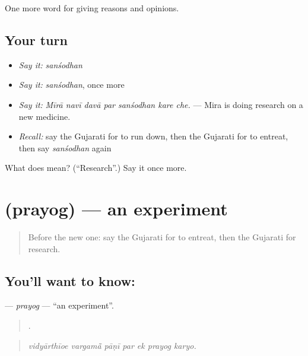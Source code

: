 \begin{grammarlens}[title={What you've built}]
One more word for giving reasons and opinions.
\end{grammarlens}

\subsection*{Your turn}
\begin{itemize}
\raggedright
  \item \emph{Say it:} \emph{sanśodhan}
  \item \emph{Say it:} \emph{sanśodhan}, once more
  \item \emph{Say it:} \emph{Mīrā navī davā par sanśodhan kare che.} — Mira is doing research on a new medicine.
  \item \emph{Recall:} say the Gujarati for to run down, then the Gujarati for to entreat, then say \emph{sanśodhan} again
\end{itemize}

\begin{tcolorbox}[breakable,colback=teal!4,colframe=teal!35!black,title={Before you move on}]
What does  mean? (\textquotedblleft{}Research\textquotedblright{}.) Say it once more.
\end{tcolorbox}
\section[\texorpdfstring{\gu{પ્રયોગ} (prayog)}{પ્રયોગ (prayog)}]{ (prayog) — an experiment}

\label{lesson:GU-C362-prayog}



\begin{quote}
Before the new one: say the Gujarati for to entreat, then the Gujarati for research.
\end{quote}

\subsection*{You'll want to know: }
\textbf{} — \emph{prayog} — \textquotedblleft{}an experiment\textquotedblright{}.

\begin{quote}
      .
\end{quote}

\begin{quote}
\emph{vidyārthīoe vargamā̃ pāṇī par ek prayog karyo.}
\end{quote}

